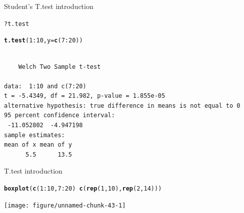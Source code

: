 \documentclass[10pt]{beamer}\usepackage[]{graphicx}\usepackage[]{color}
\makeatletter
\newcommand{\hlnum}[1]{\textcolor[rgb]{0.686,0.059,0.569}{#1}}%
\newcommand{\hlopt}[1]{\textcolor[rgb]{0,0,0}{#1}}%
\newcommand{\hlstd}[1]{\textcolor[rgb]{0.345,0.345,0.345}{#1}}%
\newcommand{\hlkwc}[1]{\textcolor[rgb]{0.333,0.667,0.333}{#1}}%
\newcommand{\hlkwd}[1]{\textcolor[rgb]{0.737,0.353,0.396}{\textbf{#1}}}%
\newenvironment{kframe}{%
 \def\at@end@of@kframe{}%
 \ifinner\ifhmode%
  \def\at@end@of@kframe{\end{minipage}}%
  \begin{minipage}{\columnwidth}%
 \fi\fi%
 \def\FrameCommand##1{\hskip\@totalleftmargin \hskip-\fboxsep
 \colorbox{shadecolor}{##1}\hskip-\fboxsep
     \hskip-\linewidth \hskip-\@totalleftmargin \hskip\columnwidth}%
 \MakeFramed {\advance\hsize-\width
   \@totalleftmargin\z@ \linewidth\hsize
   \@setminipage}}%
 {\par\unskip\endMakeFramed%
 \at@end@of@kframe}
\newenvironment{knitrout}{}{} %
\makeatother
\begin{document}
\begin{frame}[fragile]{Student's T.test introduction}%
\begin{knitrout}
\color{fgcolor}\begin{kframe}
\begin{alltt}
\hlopt{?}\hlstd{t.test}
\end{alltt}
\end{kframe}
\end{knitrout}

  \pause
\begin{knitrout}
\color{fgcolor}\begin{kframe}
\begin{alltt}
\hlkwd{t.test}\hlstd{(}\hlnum{1}\hlopt{:}\hlnum{10}\hlstd{,} \hlkwc{y} \hlstd{=} \hlkwd{c}\hlstd{(}\hlnum{7}\hlopt{:}\hlnum{20}\hlstd{))}
\end{alltt}
\begin{verbatim}

	Welch Two Sample t-test

data:  1:10 and c(7:20)
t = -5.4349, df = 21.982, p-value = 1.855e-05
alternative hypothesis: true difference in means is not equal to 0
95 percent confidence interval:
 -11.052802  -4.947198
sample estimates:
mean of x mean of y 
      5.5      13.5 
\end{verbatim}
\end{kframe}
\end{knitrout}

\end{frame}

\begin{frame}[fragile]{T.test introduction}%

\begin{knitrout}
\color{fgcolor}\begin{kframe}
\begin{alltt}
  \hlkwd{boxplot}\hlstd{(}\hlkwd{c}\hlstd{(}\hlnum{1}\hlopt{:}\hlnum{10}\hlstd{,} \hlnum{7}\hlopt{:}\hlnum{20}\hlstd{)} \hlopt{~} \hlkwd{c}\hlstd{(}\hlkwd{rep}\hlstd{(}\hlnum{1}\hlstd{,}\hlnum{10}\hlstd{),} \hlkwd{rep}\hlstd{(}\hlnum{2}\hlstd{,} \hlnum{14}\hlstd{)))}
\end{alltt}
\end{kframe}
\texttt{[image: figure/unnamed-chunk-43-1]} 

\end{knitrout}
\end{frame}
\end{document}
